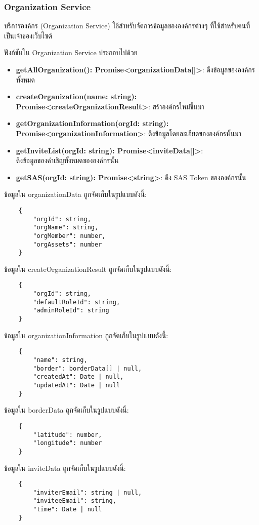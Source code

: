 \subsubsection{Organization Service}

\ifenglish
\else
บริการองค์กร (Organization Service) ใช้สำหรับจัดการข้อมูลขององค์กรต่างๆ ที่ใช้สำหรับคนที่เป็นเจ้าของเว็บไซต์

ฟังก์ชันใน Organization Service ประกอบไปด้วย

\begin{itemize}
    \item \textbf{getAllOrganization(): Promise<organizationData[]>}: ดึงข้อมูลขององค์กรทั้งหมด
    \item \textbf{createOrganization(name: string): Promise<createOrganizationResult>}: สร้าองค์กรใหม่ขึ้นมา
    \item \textbf{getOrganizationInformation(orgId: string): Promise<organizationInformation>}: ดึงข้อมูลโดยละเอียดขององค์กรนั้นมา
    \item \textbf{getInviteList(orgId: string): Promise<inviteData[]>}:\\ ดึงข้อมูลของคำเชิญทั้งหมดขององค์กรนั้น
    \item \textbf{getSAS(orgId: string): Promise<string>}: ดึง SAS Token ขององค์กรนั้น
\end{itemize}

ข้อมูลใน organizationData ถูกจัดเก็บในรูปแบบดังนี้:
\begin{lstlisting}
    {
        "orgId": string,
        "orgName": string,
        "orgMember": number,
        "orgAssets": number
    }
\end{lstlisting}

ข้อมูลใน createOrganizationResult ถูกจัดเก็บในรูปแบบดังนี้:
\begin{lstlisting}
    {
        "orgId": string,
        "defaultRoleId": string,
        "adminRoleId": string
    }
\end{lstlisting}

ข้อมูลใน organizationInformation ถูกจัดเก็บในรูปแบบดังนี้:
\begin{lstlisting}
    {
        "name": string,
        "border": borderData[] | null,
        "createdAt": Date | null,
        "updatedAt": Date | null
    }
\end{lstlisting}

ข้อมูลใน borderData ถูกจัดเก็บในรูปแบบดังนี้:
\begin{lstlisting}
    {
        "latitude": number,
        "longitude": number
    }
\end{lstlisting}

ข้อมูลใน inviteData ถูกจัดเก็บในรูปแบบดังนี้:
\begin{lstlisting}
    {
        "inviterEmail": string | null,
        "inviteeEmail": string,
        "time": Date | null
    }
\end{lstlisting}
\fi